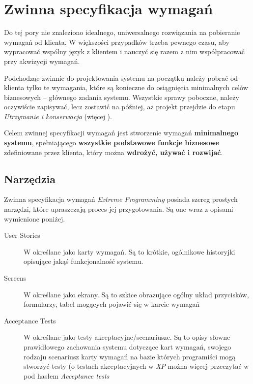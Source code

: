 \section{Zwinna specyfikacja wymagań}
\label{cha:ZMTOzwinnaSpecyfikacjaWymagan}

Do tej pory nie znaleziono idealnego, uniwersalnego rozwiązania na pobieranie wymagań od klienta. W większości przypadków trzeba pewnego czasu, aby wypracować wspólny język z klientem i nauczyć się razem z nim współpracować przy akwizycji wymagań.

Podchodząc zwinnie do projektowania systemu na początku należy pobrać od klienta tylko te wymagania, które są konieczne do osiągnięcia minimalnych celów biznesowych -- głównego zadania systemu. Wszystkie sprawy poboczne, należy oczywiście zapisywać, lecz zostawić na później, aż projekt przejdzie do etapu \textit{Utrzymanie i konserwacja} (więcej ).

Celem zwinnej specyfikacji wymagań jest stworzenie wymagań \textbf{minimalnego systemu}, spełniającego \textbf{wszystkie podstawowe funkcje biznesowe} zdefiniowane przez klienta, który można \textbf{wdrożyć, używać i rozwijać}.

\subsection{Narzędzia}
\label{sec:ZSWnarzedzia}

Zwinna specyfikacja wymagań \textit{Extreme Programming} posiada szereg prostych narzędzi, które upraszczają proces jej przygotowania. Są one wraz z opisami wymienione poniżej.

\begin{description}
    \item[User Stories]{W \cite{Mad09} określane jako karty wymagań. Są to krótkie, ogólnikowe historyjki opisujące jakąś funkcjonalność systemu.}
    \item[Screens]{W \cite{Mad09} określane jako ekrany. Są to szkice obrazujące ogólny układ przycisków, formularzy, tabel mogących pojawić się w karcie wymagań}
    \item[Acceptance Tests]{W \cite{Mad09} określane jako testy akceptacyjne/scenariusze. Są to opisy słowne prawidłowego zachowania systemu dotyczące kart wymagań, swojego rodzaju scenariusz karty wymagań na bazie których programiści mogą stworzyć testy (o testach akceptacyjnych w \textit{XP} można więcej przeczytać w \cite{Jef00} pod hasłem \textit{Acceptance tests}}
\end{description}


